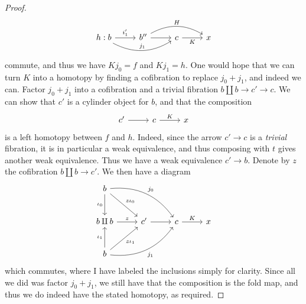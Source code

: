 \begin{proof}
\[\begin{tikzcd}[row sep = 1.5em, column sep = 2.5em]
	h:b \ar[" i_1' ", r] \ar[" j_1 ", bend right, rr]  & b'' \ar[r] \ar[" H ", bend left, rr]  & c \ar[" K "', r]  & x
	\end{tikzcd}\]
	commute, and thus we have $Kj_0=f$ and $Kj_1=h$. One would hope that we can turn $K$ into a homotopy by finding a cofibration to replace $j_0+j_1$, and indeed we can. Factor $j_0+j_1$ into a cofibration and a trivial fibration $b\amalg b\to c'\to c$. We can show that $c'$ is a cylinder object for $b$, and that the composition
	\[\begin{tikzcd}[row sep = 2.5em, column sep = 2.5em]
	c'\ar[r]  & c\ar[" K ", r]  & x
	\end{tikzcd}\]
	is a left homotopy between $f$ and $h$. Indeed, since the arrow $c'\to c$ is a \emph{trivial} fibration, it is in particular a weak equivalence, and thus composing with $t$ gives another weak equivalence. Thus we have a weak equivalence $c'\to b$. Denote by $z$ the cofibration $b\amalg b\to c'$. We then have a diagram
	\[\begin{tikzcd}[row sep = 2.5em, column sep = 2.5em]
	b \ar[" \iota_0 "', d] \ar[" z\iota_0 ", dr] \ar[" j_0 ", bend left, drr]  &  &  &  \\
	b\amalg b \ar[" z ", r]  & c' \ar[r]  & c\ar[" K ", r]  & x \\
	b \ar[" \iota_1 ", u] \ar[" z\iota_1 "', ur] \ar[" j_1 "', bend right, urr]  &  &  & 
	\end{tikzcd}\]
	which commutes, where I have labeled the inclusions simply for clarity. Since all we did was factor $j_0+j_1$, we still have that the composition is the fold map, and thus we do indeed have the stated homotopy, as required.


\end{proof}
